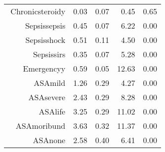 \begin{tabular}{rrrrr}
$$  Chronic\-steroid\-y & 0.03 & 0.07 & 0.45 & 0.65 \\ 
  Sepsis\-sepsis & 0.45 & 0.07 & 6.22 & 0.00 \\ 
  Sepsis\-shock & 0.51 & 0.11 & 4.50 & 0.00 \\ 
  Sepsis\-sirs & 0.35 & 0.07 & 5.28 & 0.00 \\ 
  Emergency\-y & 0.59 & 0.05 & 12.63 & 0.00 \\ 
  ASA\-mild & 1.26 & 0.29 & 4.27 & 0.00 \\ 
  ASA\-severe & 2.43 & 0.29 & 8.28 & 0.00 \\ 
  ASA\-life & 3.25 & 0.29 & 11.02 & 0.00 \\ 
  ASA\-moribund & 3.63 & 0.32 & 11.37 & 0.00 \\ 
  ASA\-none & 2.58 & 0.40 & 6.41 & 0.00 \\ 
   \hline
\end{tabular}

